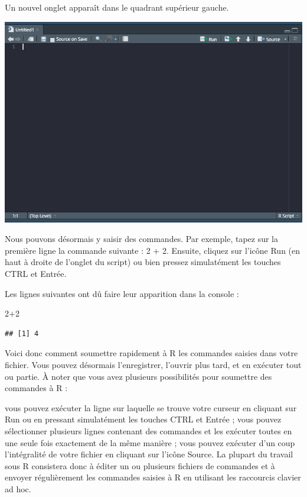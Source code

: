 \documentclass[
]{book}
\newenvironment{Shaded}{\begin{snugshade}}{\end{snugshade}}
\newcommand{\DecValTok}[1]{\textcolor[rgb]{0.00,0.00,0.81}{#1}}
\newcommand{\SpecialCharTok}[1]{\textcolor[rgb]{0.00,0.00,0.00}{#1}}
\begin{document}
Un nouvel onglet apparaît dans le quadrant supérieur gauche.

\includegraphics[width=1\linewidth]{images/espace_script}

Nous pouvons désormais y saisir des commandes. Par exemple, tapez sur la première ligne la commande suivante : 2 + 2. Ensuite, cliquez sur l'icône Run (en haut à droite de l'onglet du script) ou bien pressez simulatément les touches CTRL et Entrée.

Les lignes suivantes ont dû faire leur apparition dans la console :

\begin{Shaded}
\begin{Highlighting}[]
\DecValTok{2}\SpecialCharTok{+}\DecValTok{2}
\end{Highlighting}
\end{Shaded}

\begin{verbatim}
## [1] 4
\end{verbatim}

Voici donc comment soumettre rapidement à R les commandes saisies dans votre fichier. Vous pouvez désormais l'enregistrer, l'ouvrir plus tard, et en exécuter tout ou partie. À noter que vous avez plusieurs possibilités pour soumettre des commandes à R :

vous pouvez exécuter la ligne sur laquelle se trouve votre curseur en cliquant sur Run ou en pressant simulatément les touches CTRL et Entrée ; vous pouvez sélectionner plusieurs lignes contenant des commandes et les exécuter toutes en une seule fois exactement de la même manière ; vous pouvez exécuter d'un coup l'intégralité de votre fichier en cliquant sur l'icône Source. La plupart du travail sous R consistera donc à éditer un ou plusieurs fichiers de commandes et à envoyer régulièrement les commandes saisies à R en utilisant les raccourcis clavier ad hoc.
\end{document}

